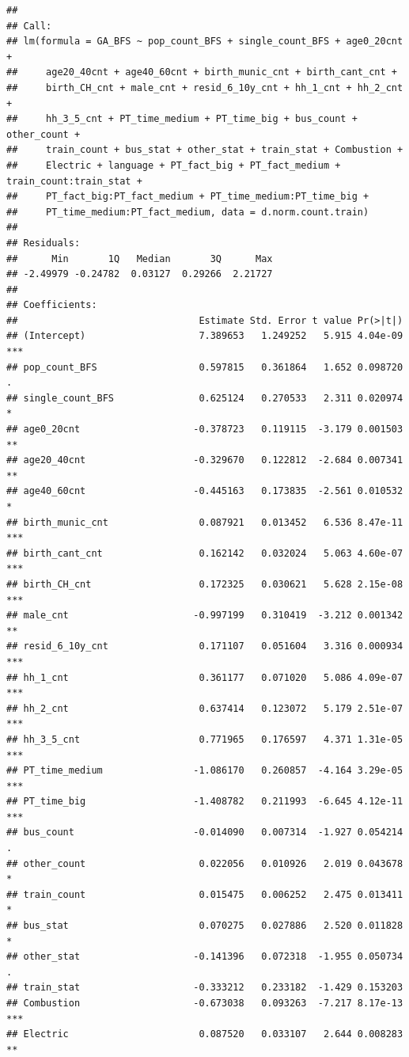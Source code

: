 \documentclass[
]{article}
\begin{document}
\begin{verbatim}
## 
## Call:
## lm(formula = GA_BFS ~ pop_count_BFS + single_count_BFS + age0_20cnt + 
##     age20_40cnt + age40_60cnt + birth_munic_cnt + birth_cant_cnt + 
##     birth_CH_cnt + male_cnt + resid_6_10y_cnt + hh_1_cnt + hh_2_cnt + 
##     hh_3_5_cnt + PT_time_medium + PT_time_big + bus_count + other_count + 
##     train_count + bus_stat + other_stat + train_stat + Combustion + 
##     Electric + language + PT_fact_big + PT_fact_medium + train_count:train_stat + 
##     PT_fact_big:PT_fact_medium + PT_time_medium:PT_time_big + 
##     PT_time_medium:PT_fact_medium, data = d.norm.count.train)
## 
## Residuals:
##      Min       1Q   Median       3Q      Max 
## -2.49979 -0.24782  0.03127  0.29266  2.21727 
## 
## Coefficients:
##                                Estimate Std. Error t value Pr(>|t|)    
## (Intercept)                    7.389653   1.249252   5.915 4.04e-09 ***
## pop_count_BFS                  0.597815   0.361864   1.652 0.098720 .  
## single_count_BFS               0.625124   0.270533   2.311 0.020974 *  
## age0_20cnt                    -0.378723   0.119115  -3.179 0.001503 ** 
## age20_40cnt                   -0.329670   0.122812  -2.684 0.007341 ** 
## age40_60cnt                   -0.445163   0.173835  -2.561 0.010532 *  
## birth_munic_cnt                0.087921   0.013452   6.536 8.47e-11 ***
## birth_cant_cnt                 0.162142   0.032024   5.063 4.60e-07 ***
## birth_CH_cnt                   0.172325   0.030621   5.628 2.15e-08 ***
## male_cnt                      -0.997199   0.310419  -3.212 0.001342 ** 
## resid_6_10y_cnt                0.171107   0.051604   3.316 0.000934 ***
## hh_1_cnt                       0.361177   0.071020   5.086 4.09e-07 ***
## hh_2_cnt                       0.637414   0.123072   5.179 2.51e-07 ***
## hh_3_5_cnt                     0.771965   0.176597   4.371 1.31e-05 ***
## PT_time_medium                -1.086170   0.260857  -4.164 3.29e-05 ***
## PT_time_big                   -1.408782   0.211993  -6.645 4.12e-11 ***
## bus_count                     -0.014090   0.007314  -1.927 0.054214 .  
## other_count                    0.022056   0.010926   2.019 0.043678 *  
## train_count                    0.015475   0.006252   2.475 0.013411 *  
## bus_stat                       0.070275   0.027886   2.520 0.011828 *  
## other_stat                    -0.141396   0.072318  -1.955 0.050734 .  
## train_stat                    -0.333212   0.233182  -1.429 0.153203    
## Combustion                    -0.673038   0.093263  -7.217 8.17e-13 ***
## Electric                       0.087520   0.033107   2.644 0.008283 ** 

\end{verbatim}
\end{document}

